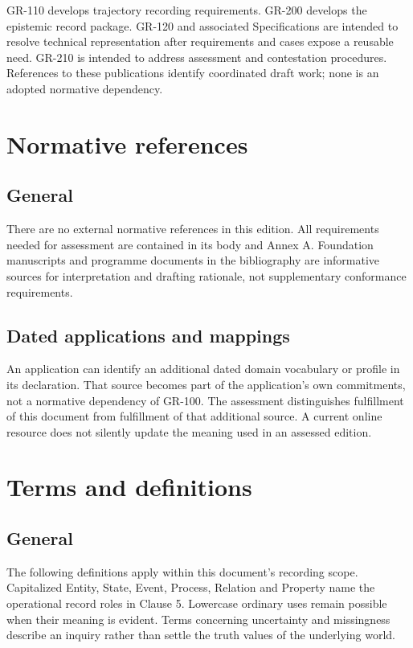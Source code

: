 \documentclass[11pt,a4paper]{article}
\begin{document}
GR-110 develops trajectory recording requirements. GR-200 develops the epistemic record package. GR-120 and associated Specifications are intended to resolve technical representation after requirements and cases expose a reusable need. GR-210 is intended to address assessment and contestation procedures. References to these publications identify coordinated draft work; none is an adopted normative dependency.

\section{Normative references}
\subsection{General}
There are no external normative references in this edition. All requirements needed for assessment are contained in its body and Annex A. Foundation manuscripts and programme documents in the bibliography are informative sources for interpretation and drafting rationale, not supplementary conformance requirements.

\subsection{Dated applications and mappings}
An application can identify an additional dated domain vocabulary or profile in its declaration. That source becomes part of the application's own commitments, not a normative dependency of GR-100. The assessment distinguishes fulfillment of this document from fulfillment of that additional source. A current online resource does not silently update the meaning used in an assessed edition.

\section{Terms and definitions}
\subsection{General}
The following definitions apply within this document's recording scope. Capitalized Entity, State, Event, Process, Relation and Property name the operational record roles in Clause 5. Lowercase ordinary uses remain possible when their meaning is evident. Terms concerning uncertainty and missingness describe an inquiry rather than settle the truth values of the underlying world.
\end{document}
